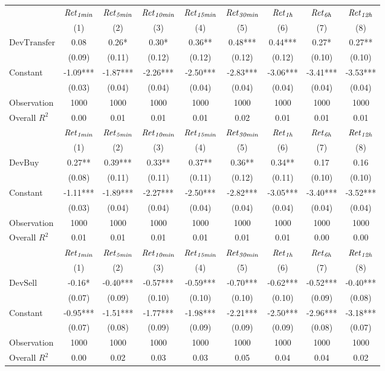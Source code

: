 \begin{tabular}{lcccccccc}
\hline
 & ${\it Ret}_{\it 1min}$ & ${\it Ret}_{\it 5min}$ & ${\it Ret}_{\it 10min}$ & ${\it Ret}_{\it 15min}$ & ${\it Ret}_{\it 30min}$ & ${\it Ret}_{\it 1h}$ & ${\it Ret}_{\it 6h}$ & ${\it Ret}_{\it 12h}$ \\
 & (1) & (2) & (3) & (4) & (5) & (6) & (7) & (8) \\
\hline
$\mathrm{Dev Transfer}$ & 0.08 & 0.26* & 0.30* & 0.36** & 0.48*** & 0.44*** & 0.27* & 0.27** \\
 & (0.09) & (0.11) & (0.12) & (0.12) & (0.12) & (0.12) & (0.10) & (0.10) \\
Constant & -1.09*** & -1.87*** & -2.26*** & -2.50*** & -2.83*** & -3.06*** & -3.41*** & -3.53*** \\
 & (0.03) & (0.04) & (0.04) & (0.04) & (0.04) & (0.04) & (0.04) & (0.04) \\
Observation & 1000 & 1000 & 1000 & 1000 & 1000 & 1000 & 1000 & 1000 \\
Overall $R^2$ & 0.00 & 0.01 & 0.01 & 0.01 & 0.02 & 0.01 & 0.01 & 0.01 \\
\hline
 & ${\it Ret}_{\it 1min}$ & ${\it Ret}_{\it 5min}$ & ${\it Ret}_{\it 10min}$ & ${\it Ret}_{\it 15min}$ & ${\it Ret}_{\it 30min}$ & ${\it Ret}_{\it 1h}$ & ${\it Ret}_{\it 6h}$ & ${\it Ret}_{\it 12h}$ \\
 & (1) & (2) & (3) & (4) & (5) & (6) & (7) & (8) \\
\hline
$\mathrm{Dev Buy}$ & 0.27** & 0.39*** & 0.33** & 0.37** & 0.36** & 0.34** & 0.17 & 0.16 \\
 & (0.08) & (0.11) & (0.11) & (0.11) & (0.12) & (0.11) & (0.10) & (0.10) \\
Constant & -1.11*** & -1.89*** & -2.27*** & -2.50*** & -2.82*** & -3.05*** & -3.40*** & -3.52*** \\
 & (0.03) & (0.04) & (0.04) & (0.04) & (0.04) & (0.04) & (0.04) & (0.04) \\
Observation & 1000 & 1000 & 1000 & 1000 & 1000 & 1000 & 1000 & 1000 \\
Overall $R^2$ & 0.01 & 0.01 & 0.01 & 0.01 & 0.01 & 0.01 & 0.00 & 0.00 \\
\hline
 & ${\it Ret}_{\it 1min}$ & ${\it Ret}_{\it 5min}$ & ${\it Ret}_{\it 10min}$ & ${\it Ret}_{\it 15min}$ & ${\it Ret}_{\it 30min}$ & ${\it Ret}_{\it 1h}$ & ${\it Ret}_{\it 6h}$ & ${\it Ret}_{\it 12h}$ \\
 & (1) & (2) & (3) & (4) & (5) & (6) & (7) & (8) \\
\hline
$\mathrm{Dev Sell}$ & -0.16* & -0.40*** & -0.57*** & -0.59*** & -0.70*** & -0.62*** & -0.52*** & -0.40*** \\
 & (0.07) & (0.09) & (0.10) & (0.10) & (0.10) & (0.10) & (0.09) & (0.08) \\
Constant & -0.95*** & -1.51*** & -1.77*** & -1.98*** & -2.21*** & -2.50*** & -2.96*** & -3.18*** \\
 & (0.07) & (0.08) & (0.09) & (0.09) & (0.09) & (0.09) & (0.08) & (0.07) \\
Observation & 1000 & 1000 & 1000 & 1000 & 1000 & 1000 & 1000 & 1000 \\
Overall $R^2$ & 0.00 & 0.02 & 0.03 & 0.03 & 0.05 & 0.04 & 0.04 & 0.02 \\
\hline
\end{tabular}
